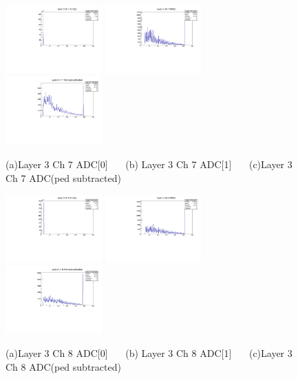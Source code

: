 \documentclass[a4paper,11pt]{article}
\theoremstyle{mytheor}
\begin{document}
\begin{figure}[H] 
\vspace*{-0.3cm} 
\includegraphics[width=0.33\textwidth,scale=0.5,trim=0 0 0 0,clip]{plotsdir/file0_test-Layer3_Ch7_adc0-1.pdf} 
\includegraphics[width=0.33\textwidth,scale=0.5,trim=0 0 0 0,clip]{plotsdir/file0_test-Layer3_Ch7_adc1-1.pdf} 
\includegraphics[width=0.33\textwidth,scale=0.5,trim=0 0 0 0,clip]{plotsdir/file0_test-Layer3_Ch7_adcPedsub-1.pdf} 
\caption{(a)Layer 3 Ch 7 ADC[0] ~~~(b) Layer 3 Ch 7 ADC[1] ~~~(c)Layer 3 Ch 7 ADC(ped subtracted) } 
\end{figure} 
\begin{figure}[H] 
\vspace*{-0.3cm} 
\includegraphics[width=0.33\textwidth,scale=0.5,trim=0 0 0 0,clip]{plotsdir/file0_test-Layer3_Ch8_adc0-1.pdf} 
\includegraphics[width=0.33\textwidth,scale=0.5,trim=0 0 0 0,clip]{plotsdir/file0_test-Layer3_Ch8_adc1-1.pdf} 
\includegraphics[width=0.33\textwidth,scale=0.5,trim=0 0 0 0,clip]{plotsdir/file0_test-Layer3_Ch8_adcPedsub-1.pdf} 
\caption{(a)Layer 3 Ch 8 ADC[0] ~~~(b) Layer 3 Ch 8 ADC[1] ~~~(c)Layer 3 Ch 8 ADC(ped subtracted) } 
\end{figure} 
\end{document}
